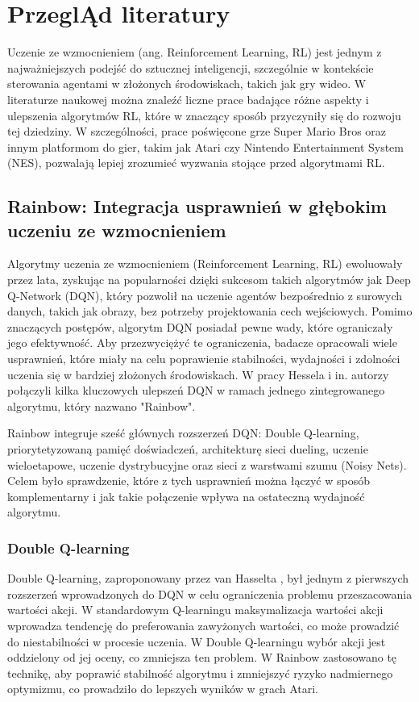 \setcounter{secnumdepth}{3}
\chapter[Przegląd literatury]{PrzeglĄd literatury}
\label{chap:przeglad}
Uczenie ze wzmocnieniem (ang. Reinforcement Learning, RL) jest jednym z najważniejszych podejść do sztucznej inteligencji, szczególnie w kontekście sterowania agentami w złożonych środowiskach, takich jak gry wideo. W literaturze naukowej można znaleźć liczne prace badające różne aspekty i ulepszenia algorytmów RL, które w znaczący sposób przyczyniły się do rozwoju tej dziedziny. W szczególności, prace poświęcone grze Super Mario Bros oraz innym platformom do gier, takim jak Atari czy Nintendo Entertainment System (NES), pozwalają lepiej zrozumieć wyzwania stojące przed algorytmami RL.

\section{Rainbow: Integracja usprawnień w głębokim uczeniu ze wzmocnieniem}

Algorytmy uczenia ze wzmocnieniem (Reinforcement Learning, RL) ewoluowały przez lata, zyskując na popularności dzięki sukcesom takich algorytmów jak Deep Q-Network (DQN), który pozwolił na uczenie agentów bezpośrednio z surowych danych, takich jak obrazy, bez potrzeby projektowania cech wejściowych. Pomimo znaczących postępów, algorytm DQN posiadał pewne wady, które ograniczały jego efektywność. Aby przezwyciężyć te ograniczenia, badacze opracowali wiele usprawnień, które miały na celu poprawienie stabilności, wydajności i zdolności uczenia się w bardziej złożonych środowiskach. W pracy Hessela i in. \cite{RAI} autorzy połączyli kilka kluczowych ulepszeń DQN w ramach jednego zintegrowanego algorytmu, który nazwano "Rainbow".

Rainbow integruje sześć głównych rozszerzeń DQN: Double Q-learning, priorytetyzowaną pamięć doświadczeń, architekturę sieci dueling, uczenie wieloetapowe, uczenie dystrybucyjne oraz sieci z warstwami szumu (Noisy Nets). Celem było sprawdzenie, które z tych usprawnień można łączyć w sposób komplementarny i jak takie połączenie wpływa na ostateczną wydajność algorytmu.

\subsection{Double Q-learning}
Double Q-learning, zaproponowany przez van Hasselta \cite{RAI}, był jednym z pierwszych rozszerzeń wprowadzonych do DQN w celu ograniczenia problemu przeszacowania wartości akcji. W standardowym Q-learningu maksymalizacja wartości akcji wprowadza tendencję do preferowania zawyżonych wartości, co może prowadzić do niestabilności w procesie uczenia. W Double Q-learningu wybór akcji jest oddzielony od jej oceny, co zmniejsza ten problem. W Rainbow zastosowano tę technikę, aby poprawić stabilność algorytmu i zmniejszyć ryzyko nadmiernego optymizmu, co prowadziło do lepszych wyników w grach Atari.


